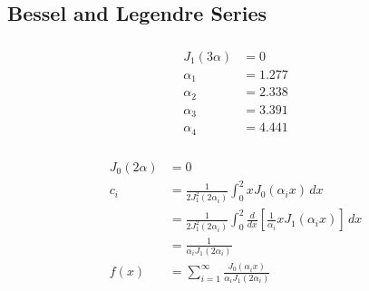 \documentclass{article}
\begin{document}
\subsection{Bessel and Legendre Series}

\subsubsection{}

\begin{align*}
  J_1(3 \alpha) & = 0     \\
  \alpha_1      & = 1.277 \\
  \alpha_2      & = 2.338 \\
  \alpha_3      & = 3.391 \\
  \alpha_4      & = 4.441
\end{align*}

\setcounter{subsubsection}{2}
\subsubsection{}

\begin{align*}
  J_0(2 \alpha) & = 0                                                                                                              \\
  c_i           & = \frac{1}{2 J_1^2(2 \alpha_i)} \int_0^2 x J_0(\alpha_i x) \,d x                                                 \\
                & = \frac{1}{2 J_1^2(2 \alpha_i)} \int_0^2 \frac{d}{d x} \left[ \frac{1}{\alpha_i} x J_1(\alpha_i x) \right] \,d x \\
                & = \frac{1}{\alpha_i J_1(2 \alpha_i)}                                                                             \\
  f(x)          & = \sum_{i = 1}^\infty \frac{J_0(\alpha_i x)}{\alpha_i J_1(2 \alpha_i)}
\end{align*}

\setcounter{subsubsection}{4}
\subsubsection{}
\end{document}

